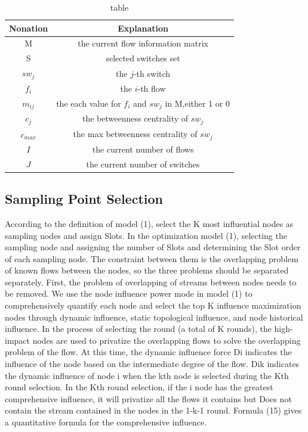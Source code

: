 \documentclass[conference,compsoc]{IEEEtran}
\begin{document}
\begin{table}[h]
\centering
\caption{table}\label{tab:tab2}
\begin{tabular}{c|c}
\hline
Nonation & Explanation\\
\hline
\hline
M & the current flow information matrix \\
\hline
S & selected switches set \\
\hline
$sw_j$ & the $j$-th switch \\
\hline
$f_i$ & the $i$-th flow \\
\hline
$m_{ij}$ & the each value for $f_i$ and $sw_j$ in M,either 1 or 0 \\
\hline
$c_j$ & the betweenness centrality of $sw_j$  \\
\hline
$c_{max}$ & the max betweenness centrality of $sw_j$  \\
\hline
$I$ & the current number of flows  \\
\hline
$J$ & the current number of switches  \\
\hline
\hline
\end{tabular}
\end{table}

\subsection{Sampling Point Selection} 

According to the definition of model (1), select the K most influential nodes as sampling nodes and assign Slots.
In the optimization model (1), selecting the sampling node and assigning the number of Slots and determining the Slot order of each sampling node. The constraint between them is the overlapping problem of known flows between the nodes, so the three problems should be separated separately. First, the problem of overlapping of streams between nodes needs to be removed. We use the node influence power mode in model (1) to comprehensively quantify each node and select the top K influence maximization nodes through dynamic influence, static topological influence, and node historical influence. In the process of selecting the round (a total of K rounds), the high-impact nodes are used to privatize the overlapping flows to solve the overlapping problem of the flow. At this time, the dynamic influence force Di indicates the influence of the node based on the intermediate degree of the flow. Dik indicates the dynamic influence of node i when the kth node is selected during the Kth round selection. In the Kth round selection, if the i node has the greatest comprehensive influence, it will privatize all the flows it contains but Does not contain the stream contained in the nodes in the 1-k-1 round.
Formula (15) gives a quantitative formula for the comprehensive influence.
\end{document}
